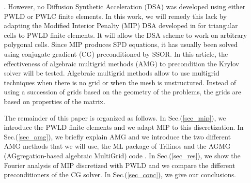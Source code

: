 \cite{pwl_diffusion}. However, no Diffusion Synthetic Acceleration (DSA) 
\cite{dsa_ref,larsen_dsa,consistent_p1,mip} was developed using either PWLD or
PWLC finite elements. In this work, we will remedy this lack by adapting the 
Modified Interior Penalty (MIP) DSA developed in \cite{mip} for triangular 
cells to PWLD finite elements. It will allow the DSA scheme to work on arbitrary 
polygonal cells. Since MIP produces SPD equations, it has usually 
been solved using conjugate gradient (CG) preconditioned by SSOR. In this
article, the effectiveness of algebraic multigrid methods (AMG) to precondition 
the Krylov solver \cite{amg,amg_course} will be tested. Algebraic multigrid methods 
allow to use multigrid techniques when there is no grid or when the mesh is 
unstructured. Instead of using a succession of grids based on the geometry of the 
problems, the grids are based on properties of the matrix.

The remainder of this paper is organized as follows. In Sec.(\ref{sec_mip}),
we introduce the PWLD finite elements and we adapt MIP to this discretization. 
In Sec.(\ref{sec_amg}), we briefly explain AMG and we introduce the two different 
AMG methods that we will use, the ML package of Trilinos \cite{ml_guide} and the 
AGMG (AGgregation-based algebraic MultiGrid) code \cite{agmg_guide}. In 
Sec.(\ref{sec_res}), we show the Fourier analysis of MIP discretized with PWLD
and we compare the different preconditioners of the CG solver. In 
Sec.(\ref{sec_conc}), we give our conclusions.
